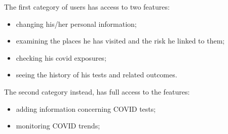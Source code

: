 \newline
The first category of users has access to two features:
\begin{itemize}
    \item changing his/her personal information;
    \item examining the places he has visited and the risk he linked to them;
    \item checking his covid exposures;
    \item seeing the history of his tests and related outcomes.
\end{itemize}
The second category instead, has full access to the features:
\begin{itemize}
    \item adding information concerning COVID tests;
    \item monitoring COVID trends;
\end{itemize}
